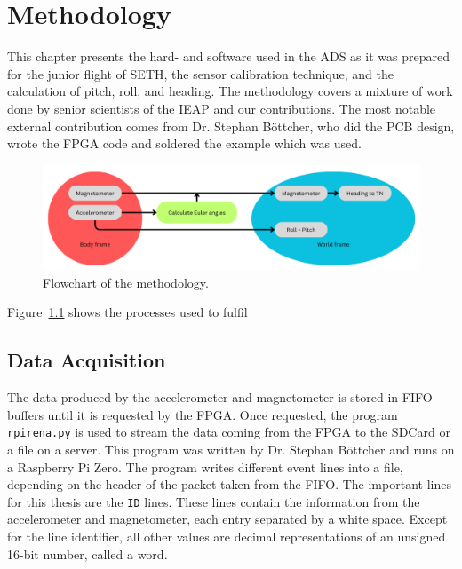 \chapter{Methodology \label{ch:methodology}}
This chapter presents the hard- and software used in the \ac{ADS} as it was prepared for the junior flight of \ac{SETH}, the sensor calibration technique, and the calculation of pitch, roll, and heading. The methodology covers a mixture of work done by senior scientists of the \ac{IEAP} and our contributions. The most notable external contribution comes from Dr. Stephan Böttcher, who did the \ac{PCB} design, wrote the \ac{FPGA} code and soldered the example which was used. 

\begin{figure}[H]
    \centering
    \includegraphics[width=0.75\linewidth]{images/02_methodology/ads_flowchart.png}
    \caption{Flowchart of the methodology.}
    \label{fig:meth:ads_flowchart}
\end{figure}

Figure~\ref{fig:meth:ads_flowchart} shows the processes used to fulfil

\section{Data Acquisition \label{sec:meth:data_acquisition}}
The data produced by the accelerometer and magnetometer is stored in \ac{FIFO} buffers until it is requested by the \ac{FPGA}. Once requested, the program \verb|rpirena.py| is used to stream the data coming from the \ac{FPGA} to the SD\:Card or a file on a server. This program was written by Dr. Stephan Böttcher and runs on a Raspberry Pi Zero. The program writes different event lines into a file, depending on the header of the packet taken from the \ac{FIFO}. The important lines for this thesis are the \verb|ID| lines. These lines contain the information from the accelerometer and magnetometer, each entry separated by a white space. Except for the line identifier, all other values are decimal representations of an unsigned 16-bit number, called a word.

